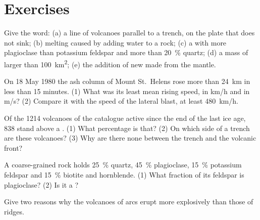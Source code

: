 \section{Exercises}

\begin{exercise}[$\star$]\label{exo:g12:subduction-magmatism:1}
Give the word: (a) a line of volcanoes parallel to a trench, on the plate
that does not sink; (b) melting caused by adding water to a rock; (c) a
 with more plagioclase than potassium feldspar and more than
\qty{20}{\percent} quartz; (d) a mass of  larger than
\qty{100}{km^2}; (e) the addition of new  made from the
mantle.
\end{exercise}

\begin{exercise}[$\star$]\label{exo:g12:subduction-magmatism:2}
On 18 May 1980 the ash column of Mount St.~Helens rose more than \qty{24}{km}
in less than 15 minutes. (1) What was its least mean rising speed, in
\unit{km/h} and in \unit{m/s}? (2) Compare it with the speed of the lateral
blast, at least \qty{480}{km/h}.
\end{exercise}

\begin{exercise}[$\star$]\label{exo:g12:subduction-magmatism:3}
Of the 1214 volcanoes of the catalogue active since the end of the last ice
age, 838 stand above a . (1) What percentage is that? (2) On
which side of a trench are these volcanoes? (3) Why are there none between
the trench and the volcanic front?
\end{exercise}

\begin{exercise}[$\star$]\label{exo:g12:subduction-magmatism:4}
A coarse-grained rock holds \qty{25}{\percent} quartz, \qty{45}{\percent}
plagioclase, \qty{15}{\percent} potassium feldspar and \qty{15}{\percent}
biotite and hornblende. (1) What fraction of its feldspar is plagioclase?
(2) Is it a ?
\end{exercise}

\begin{exercise}[$\star$]\label{exo:g12:subduction-magmatism:5}
Give two reasons why the volcanoes of arcs erupt more explosively than those
of ridges.
\end{exercise}

